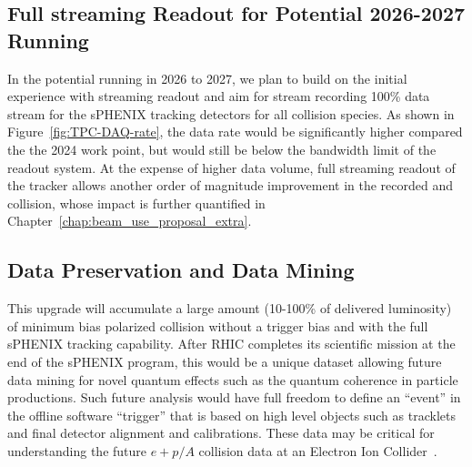 

\subsection{Full streaming Readout for Potential 2026-2027 Running}

In the potential running in 2026 to 2027, we plan to build on the initial experience with streaming readout and aim for stream recording 100\% data stream for the sPHENIX tracking detectors for all collision species. As shown in Figure~\ref{fig:TPC-DAQ-rate}, the data rate would be significantly higher compared the the 2024 work point, but would still be below the bandwidth limit of the readout system. At the expense of higher data volume, full streaming readout of the tracker allows another order of magnitude improvement in the recorded \pp and \pA collision, whose impact is further quantified in Chapter~\ref{chap:beam_use_proposal_extra}.

\subsection{Data Preservation and Data Mining}

This upgrade will accumulate a large amount (10-100\% of delivered luminosity) 
of minimum
bias polarized \pp collision without a trigger bias and with the full
sPHENIX tracking capability. After RHIC completes its scientific
mission at the end of the sPHENIX program, this would be a unique
dataset allowing future data mining for novel quantum effects such as
the quantum coherence in particle productions. 
Such future analysis would have full freedom to define an ``event'' in the offline software ``trigger'' that is based on high level objects such as tracklets and final detector alignment and calibrations. 
These \pp data may be
critical for understanding the future $e+p/A$ collision data at an
Electron Ion Collider~\cite{Accardi2012}.
